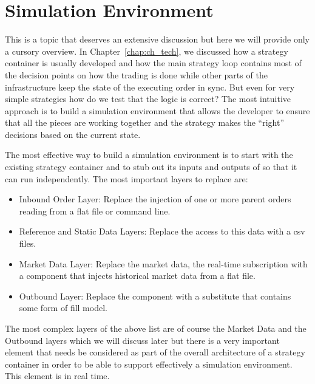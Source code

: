 \section{Simulation Environment\label{sec:sim_env}}

This is a topic that deserves an extensive discussion but here we will provide only a cursory overview. In Chapter~\ref{chap:ch_tech}, we discussed how a strategy container is usually developed and how the main strategy loop contains most of the decision points on how the trading is done while other parts of the infrastructure keep the state of the executing order in sync. But even for very simple strategies how do we test that the logic is correct? The most intuitive approach is to build a simulation environment that allows the developer to ensure that all the pieces are working together and the strategy makes the ``right'' decisions based on the current state. 


The most effective way to build a simulation environment is to start with the existing strategy container and to stub out its inputs and outputs of so that it can run independently.  The most important layers to replace are:
        \begin{itemize}
        \item Inbound Order Layer: Replace the injection of one or more parent orders reading from a flat file or command line.
        \item Reference and Static Data Layers: Replace the access to this data with a csv files.
        \item Market Data Layer: Replace the market data, the real-time subscription with a component that injects historical market data from a flat file.
        \item Outbound Layer: Replace the component with a substitute that contains some form of fill model.
        \end{itemize}


The most complex layers of the above list are of course the Market Data and the Outbound layers which we will discuss later but there is a very important element that needs be considered as part of the overall architecture of a strategy container in order to be able to support effectively a simulation environment. This element is in real time. \twomedskip


